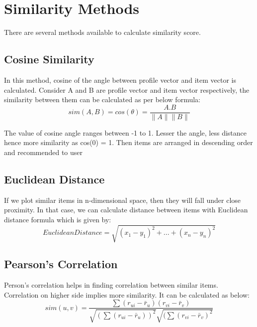 
\section{Similarity Methods}
There are several methods available to calculate similarity score.
\\

\subsection{Cosine Similarity}
In this method, cosine of the angle between profile vector and item vector is calculated. Consider A and B are profile vector and item vector respectively, the similarity between them can be calculated as per below formula:
\\

\begin{equation}
sim(A,B) = cos(\theta) =\frac {A.B}{\parallel A \parallel \parallel B \parallel}
\end{equation}

\noindent The value of cosine angle ranges between -1 to 1. Lesser the angle, less distance hence more similarity as cos(0) = 1. Then items are arranged in descending order and recommended to user
\\
\subsection{Euclidean Distance}
If we plot similar items in n-dimensional space, then they will fall under close proximity. In that case, we can calculate distance between items with Euclidean distance formula which is given by:
\\
\begin{equation}
Euclidean Distance = \sqrt{(x_1 - y_1)^2 + ... + (x_n - y_n)^2}
\end{equation}


\subsection{Pearson’s Correlation}
Person’s correlation helps in finding correlation between similar items. Correlation on higher side implies more similarity. It can be calculated as below:
\\
\begin{equation}
sim(u,v) = \frac{\sum (r_{ui} - \bar{r}_u) (r_{vi} - \bar{r}_v )}{\sqrt{(\sum (r_{ui} - \bar{r}_u))^2} \sqrt{(\sum (r_{vi} - \bar{r}_v )^2}}
\end{equation}
\\